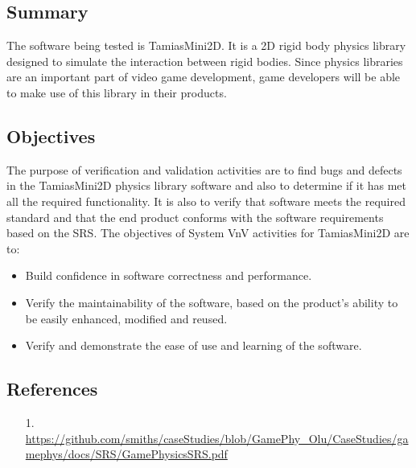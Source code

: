 \documentclass[12pt, titlepage]{article}
\begin{document}
\subsection{Summary}
The software being tested is TamiasMini2D. It is a 2D rigid body physics library designed to simulate the interaction between rigid bodies. Since physics libraries are an important part of video game development, game developers will be able to make use of this library in their products.

\subsection{Objectives}

The purpose of verification and validation activities are to find bugs and defects in the TamiasMini2D physics library software and also to determine if it has met all the required functionality. It is also to verify that software meets the required standard and that the end product conforms with the software requirements based on the SRS. The objectives of System VnV activities for TamiasMini2D are to:
  \begin{itemize}
	\item Build confidence in software correctness and performance.
	\item Verify the maintainability of the software, based on the product's ability to be easily enhanced, modified
	  and reused.
	\item Verify and demonstrate the ease of use and learning of the software.
  \end{itemize}
	


\subsection{References}


\begin{itemize}
	\item[1.] \url {https://github.com/smiths/caseStudies/blob/GamePhy_Olu/CaseStudies/gamephys/docs/SRS/GamePhysicsSRS.pdf}
\end{itemize}
\end{document}
